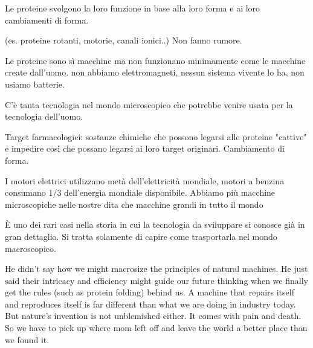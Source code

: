 Le proteine svolgono la loro funzione in base alla loro forma e ai loro cambiamenti di forma.

(es. proteine rotanti, motorie, canali ionici..)
Non fanno rumore. 

Le proteine sono sì macchine ma non funzionano minimamente come le macchine create dall'uomo. non abbiamo elettromagneti, nessun sistema vivente lo ha, non usiamo batterie. 

C'è tanta tecnologia nel mondo microscopico che potrebbe venire usata per la tecnologia dell'uomo.

Target farmacologici: sostanze chimiche che possono legarsi alle proteine "cattive" e impedire così che possano legarsi ai loro target originari.
Cambiamento di forma.

I motori elettrici utilizzano metà dell'elettricità mondiale, motori a benzina consumano 1/3 dell'energia mondiale disponibile.
Abbiamo più macchine microscopiche nelle nostre dita che macchine grandi in tutto il mondo

È uno dei rari casi nella storia in cui la tecnologia da sviluppare si conosce già in gran dettaglio. Si tratta solamente di capire come trasportarla nel mondo macroscopico.

He didn't say how we might macrosize the principles of natural machines. He just said their intricacy and efficiency might guide our future thinking when we finally get the rules (such as protein folding) behind us. A machine that repairs itself and reproduces itself is far different than what we are doing in industry today. But nature's invention is not unblemished either. It comes with pain and death. So we have to pick up where mom left off and leave the world a better place than we found it.


